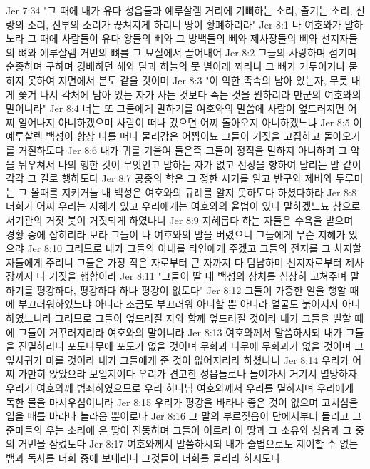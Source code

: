 Jer 7:34  "그 때에 내가 유다 성읍들과 예루살렘 거리에 기뻐하는 소리, 즐기는 소리, 신랑의 소리, 신부의 소리가 끊쳐지게 하리니 땅이 황폐하리라"
Jer 8:1  나 여호와가 말하노라 그 때에 사람들이 유다 왕들의 뼈와 그 방백들의 뼈와 제사장들의 뼈와 선지자들의 뼈와 예루살렘 거민의 뼈를 그 묘실에서 끌어내어
Jer 8:2  그들의 사랑하며 섬기며 순종하며 구하며 경배하던 해와 달과 하늘의 뭇 별아래 쬐리니 그 뼈가 거두이거나 묻히지 못하여 지면에서 분토 같을 것이며
Jer 8:3  "이 악한 족속의 남아 있는자, 무릇 내게 쫓겨 나서 각처에 남아 있는 자가 사는 것보다 죽는 것을 원하리라 만군의 여호와의 말이니라"
Jer 8:4  너는 또 그들에게 말하기를 여호와의 말씀에 사람이 엎드러지면 어찌 일어나지 아니하겠으며 사람이 떠나 갔으면 어찌 돌아오지 아니하겠느냐
Jer 8:5  이 예루살렘 백성이 항상 나를 떠나 물러감은 어찜이뇨 그들이 거짓을 고집하고 돌아오기를 거절하도다
Jer 8:6  내가 귀를 기울여 들은즉 그들이 정직을 말하지 아니하며 그 악을 뉘우쳐서 나의 행한 것이 무엇인고 말하는 자가 없고 전장을 향하여 달리는 말 같이 각각 그 길로 행하도다
Jer 8:7  공중의 학은 그 정한 시기를 알고 반구와 제비와 두루미는 그 올때를 지키거늘 내 백성은 여호와의 규례를 알지 못하도다 하셨다하라
Jer 8:8  너희가 어찌 우리는 지혜가 있고 우리에게는 여호와의 율법이 있다 말하겠느뇨 참으로 서기관의 거짓 붓이 거짓되게 하였나니
Jer 8:9  지혜롭다 하는 자들은 수욕을 받으며 경황 중에 잡히리라 보라 그들이 나 여호와의 말을 버렸으니 그들에게 무슨 지혜가 있으랴
Jer 8:10  그러므로 내가 그들의 아내를 타인에게 주겠고 그들의 전지를 그 차지할 자들에게 주리니 그들은 가장 작은 자로부터 큰 자까지 다 탐남하며 선지자로부터 제사장까지 다 거짓을 행함이라
Jer 8:11  "그들이 딸 내 백성의 상처를 심상히 고쳐주며 말하기를 평강하다, 평강하다 하나 평강이 없도다"
Jer 8:12  그들이 가증한 일을 행할 때에 부끄러워하였느냐 아니라 조금도 부끄러워 아니할 뿐 아니라 얼굴도 붉어지지 아니하였느니라 그러므로 그들이 엎드러질 자와 함께 엎드러질 것이라 내가 그들을 벌할 때에 그들이 거꾸러지리라 여호와의 말이니라
Jer 8:13  여호와께서 말씀하시되 내가 그들을 진멸하리니 포도나무에 포도가 없을 것이며 무화과 나무에 무화과가 없을 것이며 그 잎사귀가 마를 것이라 내가 그들에게 준 것이 없어지리라 하셨나니
Jer 8:14  우리가 어찌 가만히 앉았으랴 모일지어다 우리가 견고한 성읍들로나 들어가서 거기서 멸망하자 우리가 여호와께 범죄하였으므로 우리 하나님 여호와께서 우리를 멸하시며 우리에게 독한 물을 마시우심이니라
Jer 8:15  우리가 평강을 바라나 좋은 것이 없으며 고치심을 입을 때를 바라나 놀라움 뿐이로다
Jer 8:16  그 말의 부르짖음이 단에서부터 들리고 그 준마들의 우는 소리에 온 땅이 진동하며 그들이 이르러 이 땅과 그 소유와 성읍과 그 중의 거민을 삼켰도다
Jer 8:17  여호와께서 말씀하시되 내가 술법으로도 제어할 수 없는 뱀과 독사를 너희 중에 보내리니 그것들이 너희를 물리라 하시도다
